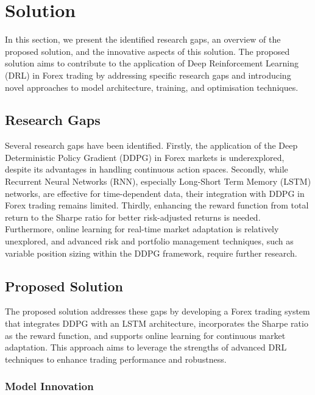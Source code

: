 \section{Solution}

In this section, we present the identified research gaps, an overview of the proposed solution, and the innovative aspects of this solution. The proposed solution aims to contribute to the application of Deep Reinforcement Learning (DRL) in Forex trading by addressing specific research gaps and introducing novel approaches to model architecture, training, and optimisation techniques.

\subsection{Research Gaps}

Several research gaps have been identified. Firstly, the application of the Deep Deterministic Policy Gradient (DDPG) in Forex markets is underexplored, despite its advantages in handling continuous action spaces. Secondly, while Recurrent Neural Networks (RNN), especially Long-Short Term Memory (LSTM) networks, are effective for time-dependent data, their integration with DDPG in Forex trading remains limited. Thirdly, enhancing the reward function from total return to the Sharpe ratio for better risk-adjusted returns is needed. Furthermore, online learning for real-time market adaptation is relatively unexplored, and advanced risk and portfolio management techniques, such as variable position sizing within the DDPG framework, require further research.

\subsection{Proposed Solution}

The proposed solution addresses these gaps by developing a Forex trading system that integrates DDPG with an LSTM architecture, incorporates the Sharpe ratio as the reward function, and supports online learning for continuous market adaptation. This approach aims to leverage the strengths of advanced DRL techniques to enhance trading performance and robustness.

\subsubsection{Model Innovation}

